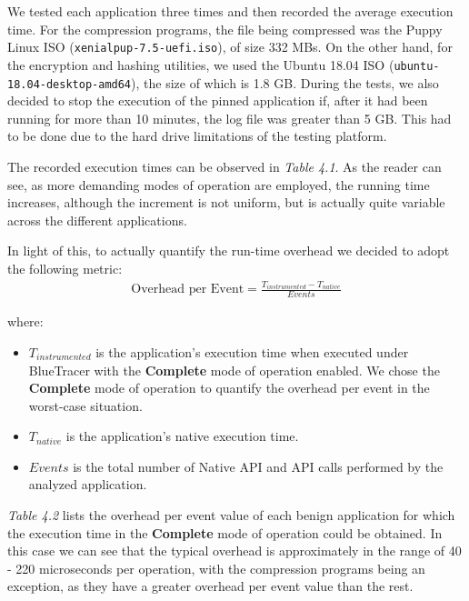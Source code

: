 We tested each application three times and then recorded the average execution time. For the compression programs, the file being compressed was the Puppy Linux ISO (\texttt{xenialpup-7.5-uefi.iso}), of size 332 MBs. On the other hand, for the encryption and hashing utilities, we used the Ubuntu 18.04 ISO (\texttt{ubuntu-18.04-desktop-amd64}), the size of which is 1.8 GB. During the tests, we also decided to stop the execution of the pinned application if, after it had been running for more than 10 minutes, the log file was greater than 5 GB. This had to be done due to the hard drive limitations of the testing platform.      

The recorded execution times can be observed in \textit{Table 4.1}. As the reader can see, as more demanding modes of operation are employed, the running time increases, although the increment is not uniform, but is actually quite variable across the different applications.

In light of this, to actually quantify the run-time overhead we decided to adopt the following metric:
\vspace{-0.1cm}
\begin{align*}
\text{Overhead per Event} = \frac{T_{instrumented} - T_{native}}{Events}
\end{align*}

where:
\begin{itemize}
\item $T_{instrumented}$ is the application's execution time when executed under BlueTracer with the \textbf{Complete} mode of operation enabled. We chose the \textbf{Complete} mode of operation to quantify the overhead per event in the worst-case situation.
\item $T_{native}$ is the application's native execution time.
\item $Events$ is the total number of Native API and API calls performed by the analyzed application.
\end{itemize}

\textit{Table 4.2} lists the overhead per event value of each benign application for which the execution time in the \textbf{Complete} mode of operation could be obtained. In this case we can see that the typical overhead is approximately in the range of 40 - 220 microseconds per operation, with the compression programs being an exception, as they have a greater overhead per event value than the rest.

